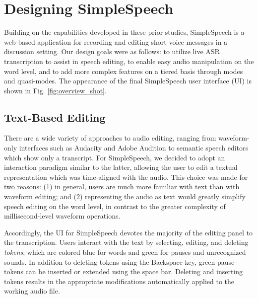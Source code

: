 \section{Designing SimpleSpeech}
Building on the capabilities developed in these prior studies, SimpleSpeech is a web-based application for recording and editing short voice messages in a discussion setting.
Our design goals were as follows: to utilize live ASR transcription to assist in speech editing, to enable easy audio manipulation on the word level, and to add more complex features on a tiered basis through modes and quasi-modes.
The appearance of the final SimpleSpeech user interface (UI) is shown in Fig. \ref{fig:overview_shot}.


\subsection{Text-Based Editing}
There are a wide variety of approaches to audio editing, ranging from waveform-only interfaces such as Audacity and Adobe Audition to semantic speech editors \cite{whittaker_semantic} which show only a transcript. 
For SimpleSpeech, we decided to adopt an interaction paradigm similar to the latter, allowing the user to edit a textual representation which was time-aligned with the audio.
This choice was made for two reasons: (1) in general, users are much more familiar with text than with waveform editing; and (2) representing the audio as text would greatly simplify speech editing on the word level, in contrast to the greater complexity of millisecond-level waveform operations. 

Accordingly, the UI for SimpleSpeech devotes the majority of the editing panel to the transcription. 
Users interact with the text by selecting, editing, and deleting \textit{tokens}, which are colored blue for words and green for pauses and unrecognized sounds. 
In addition to deleting tokens using the Backspace key, green pause tokens can be inserted or extended using the space bar.
Deleting and inserting tokens results in the appropriate modifications automatically applied to the working audio file.

